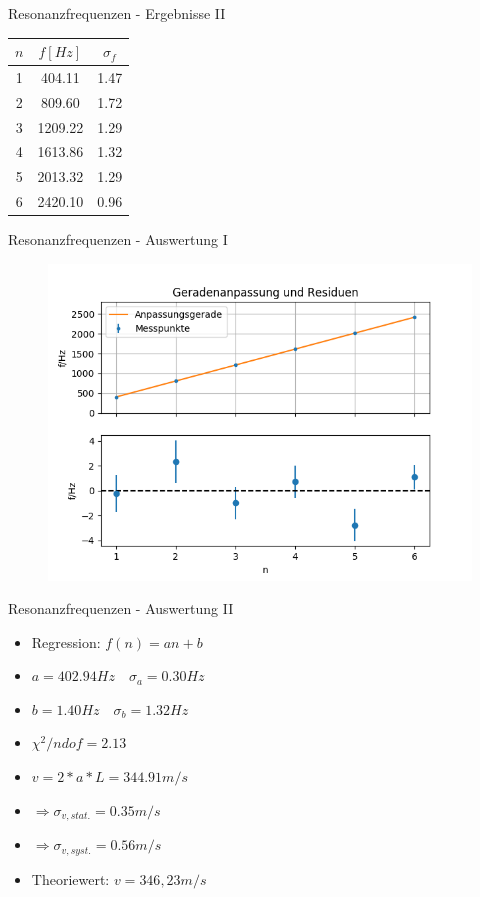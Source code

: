 \documentclass[12pt]{beamer}
\begin{document}
	\begin{frame}{Resonanzfrequenzen - Ergebnisse II}
	\begin{table}
	\begin{tabular}{|c|c|c|}
	\hline 
	$n$ & $f[Hz]$ & $\sigma_f$ \\ 
	\hline 
	1 & 404.11 & 1.47 \\ 
	\hline 
	2 & 809.60 & 1.72 \\ 
	\hline 
	3 & 1209.22 & 1.29 \\ 
	\hline 
	4 & 1613.86 & 1.32 \\ 
	\hline 
	5 & 2013.32 & 1.29 \\ 
	\hline 
	6 & 2420.10 & 0.96 \\ 
	\hline
	\end{tabular} 
	\end{table}
	\end{frame}
	
	\begin{frame}{Resonanzfrequenzen - Auswertung I}
	\begin{figure}
	\includegraphics[width=\linewidth , height=0.75\textheight]{fitplot}
	\end{figure}
	\end{frame}
	
	\begin{frame}{Resonanzfrequenzen - Auswertung II}
	\begin{itemize}
	\item Regression: $f(n)=a n+b$
	\item $a=402.94Hz \quad \sigma_a=0.30Hz$
	\item $b=1.40Hz \quad \sigma_b=1.32Hz$
	\item $\chi^2/ndof=2.13$
	\item $v= 2*a*L = 344.91m/s$
	\item $\Rightarrow \sigma_{v,stat.}=0.35m/s$
	\item $\Rightarrow \sigma_{v,syst.}=0.56m/s$ \\ [0,4cm]
	\item Theoriewert: $v=346,23 m/s$
	\end{itemize}
	\end{frame}
	
\end{document}
